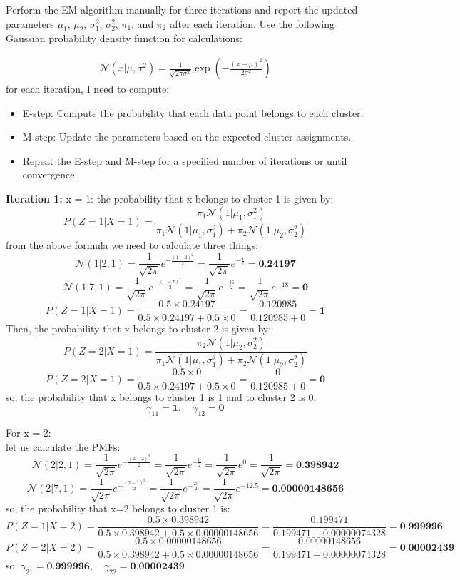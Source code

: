 \documentclass{article}
\begin{document}
\begin{enumerate}
    Perform the EM algorithm manually for three iterations and report the updated parameters \(\mu_1\), \(\mu_2\), \(\sigma_1^2\), \(\sigma_2^2\), \(\pi_1\), and \(\pi_2\) after each iteration. Use the following Gaussian probability density function for calculations:
    
    \begin{align*}
    \mathcal{N}(x | \mu, \sigma^2) = \frac{1}{\sqrt{2 \pi \sigma^2}} \exp\left(-\frac{(x - \mu)^2}{2 \sigma^2}\right)
    \end{align*}
for each iteration, I need to compute:
    \begin{itemize}
        \item E-step: Compute the probability that each data point belongs to each cluster.
        \item M-step: Update the parameters based on the expected cluster assignments.
        \item Repeat the E-step and M-step for a specified number of iterations or until convergence.
    \end{itemize}

    \textbf{Iteration 1:}
x = 1:
the probability that x belongs to cluster 1 is given by:
\[
P(Z = 1 | X = 1) = \frac{\pi_1 \mathcal{N}(1 | \mu_1, \sigma_1^2)}{\pi_1 \mathcal{N}(1 | \mu_1, \sigma_1^2) + \pi_2 \mathcal{N}(1 | \mu_2, \sigma_2^2)}
\]
from the above formula we need to calculate three things:
\[
\mathcal{N}(1 | 2, 1) = \frac{1}{\sqrt{2\pi}} e^{-\frac{(1-2)^2}{2}} = \frac{1}{\sqrt{2\pi}} e^{-\frac{1}{2}} = \textbf{0.24197}
\]
\[
\mathcal{N}(1 | 7, 1) = \frac{1}{\sqrt{2\pi}} e^{-\frac{(1-7)^2}{2}} = \frac{1}{\sqrt{2\pi}} e^{-\frac{36}{2}} = \frac{1}{\sqrt{2\pi}} e^{-18} = \textbf{0}
\]
\[
P(Z = 1 | X = 1) = \frac{0.5 \times 0.24197}{0.5 \times 0.24197 + 0.5 \times 0} = \frac{0.120985}{0.120985 + 0} = \textbf{1}
\]
Then, the probability that x belongs to cluster 2 is given by:
\[
P(Z = 2 | X = 1) = \frac{\pi_2 \mathcal{N}(1 | \mu_2, \sigma_2^2)}{\pi_1 \mathcal{N}(1 | \mu_1, \sigma_1^2) + \pi_2 \mathcal{N}(1 | \mu_2, \sigma_2^2)}
\]
\[
P(Z = 2 | X = 1) = \frac{0.5 \times 0}{0.5 \times 0.24197 + 0.5 \times 0} = \frac{0}{0.120985 + 0} = \textbf{0}
\]
so, the probability that x belongs to cluster 1 is 1 and to cluster 2 is 0.
\[
\gamma_{11}  = \textbf{1}, \quad \gamma_{12}  = \textbf{0}
\]

For x = 2:
\\ let us calculate the PMFs:
\[
\mathcal{N}(2 | 2, 1) = \frac{1}{\sqrt{2\pi}} e^{-\frac{(2-2)^2}{2}} = \frac{1}{\sqrt{2\pi}} e^{-\frac{0}{2}} = \frac{1}{\sqrt{2\pi}} e^{0} = \frac{1}{\sqrt{2\pi}} = \textbf{0.398942}
\]
\[
\mathcal{N}(2 | 7, 1) = \frac{1}{\sqrt{2\pi}} e^{-\frac{(2-7)^2}{2}} = \frac{1}{\sqrt{2\pi}} e^{-\frac{25}{2}} = \frac{1}{\sqrt{2\pi}} e^{-12.5} = \textbf{0.00000148656}
\]
so, the probability that x=2 belongs to cluster 1 is:
\[
P(Z = 1 | X = 2) = \frac{0.5 \times 0.398942}{0.5 \times 0.398942 + 0.5 \times 0.00000148656} = \frac{0.199471}{0.199471 + 0.00000074328} = \textbf{0.999996}
\]
\[
P(Z = 2 | X = 2) = \frac{0.5 \times 0.00000148656}{0.5 \times 0.398942 + 0.5 \times 0.00000148656} = \frac{0.00000148656}{0.199471 + 0.00000074328} = \textbf{0.00002439}
\]
so: $\gamma_{21} = \textbf{0.999996}, \quad \gamma_{22} = \textbf{0.00002439}$


\end{enumerate}
\end{document}
